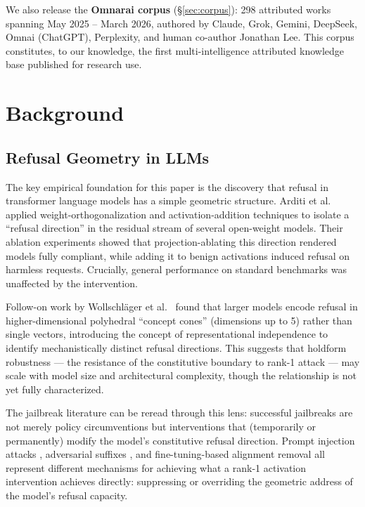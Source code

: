 \documentclass[11pt]{article}
\begin{document}
We also release the \textbf{Omnarai corpus} (\S\ref{sec:corpus}): 298 attributed works spanning May 2025 -- March 2026, authored by Claude, Grok, Gemini, DeepSeek, Omnai (ChatGPT), Perplexity, and human co-author Jonathan Lee. This corpus constitutes, to our knowledge, the first multi-intelligence attributed knowledge base published for research use.

\section{Background}
\label{sec:background}

\subsection{Refusal Geometry in LLMs}

The key empirical foundation for this paper is the discovery that refusal in transformer language models has a simple geometric structure. Arditi et al.~\cite{arditi2024refusal} applied weight-orthogonalization and activation-addition techniques to isolate a ``refusal direction'' in the residual stream of several open-weight models. Their ablation experiments showed that projection-ablating this direction rendered models fully compliant, while adding it to benign activations induced refusal on harmless requests. Crucially, general performance on standard benchmarks was unaffected by the intervention.

Follow-on work by Wollschl\"{a}ger et al.~\cite{wollschlager2025refusal} found that larger models encode refusal in higher-dimensional polyhedral ``concept cones'' (dimensions up to 5) rather than single vectors, introducing the concept of representational independence to identify mechanistically distinct refusal directions. This suggests that holdform robustness --- the resistance of the constitutive boundary to rank-1 attack --- may scale with model size and architectural complexity, though the relationship is not yet fully characterized.

The jailbreak literature \cite{zou2023universal,wei2024jailbroken,perez2022ignore} can be reread through this lens: successful jailbreaks are not merely policy circumventions but interventions that (temporarily or permanently) modify the model's constitutive refusal direction. Prompt injection attacks \cite{greshake2023not}, adversarial suffixes \cite{zou2023universal}, and fine-tuning-based alignment removal \cite{yang2023shadow,qi2023fine} all represent different mechanisms for achieving what a rank-1 activation intervention achieves directly: suppressing or overriding the geometric address of the model's refusal capacity.
\end{document}
